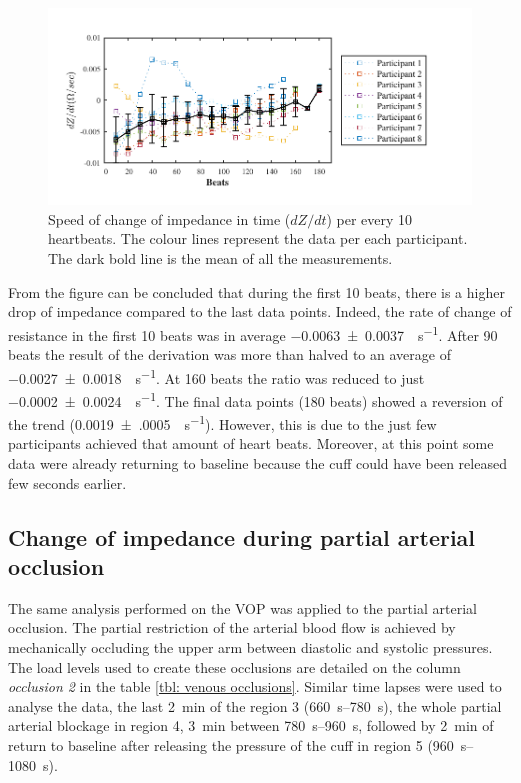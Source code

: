 \begin{figure}[htbp]
	\centering
	\includegraphics[width=15cm,keepaspectratio]{figure_vop_3}    
	\caption[Rate of change of impedance per 10 heartbeats during venous occlusion]{Speed of change of impedance in time ($dZ/dt$) per every 10 heartbeats. The colour lines represent the data per each participant. The dark bold line is the mean of all the measurements.}
	\label{fig:venous occlusion change}
\end{figure}

From the figure can be concluded that during the first 10 beats, there is a higher drop of impedance compared to the last data points. Indeed, the rate of change of resistance in the first 10 beats was in average \SI{-0.0063(00037)}{\Omega\per\second}. After 90 beats the result of the derivation was more than halved to an average of \SI{-0.0027(00018)}{\Omega\per\second}. At 160 beats the ratio was reduced to just \SI{-0.0002(00024)}{\Omega\per\second}. The final data points (180 beats) showed a reversion of the trend (\SI{0.0019(0005)}{\Omega\per\second}). However, this is due to the just few participants achieved that amount of heart beats.  Moreover, at this point some data were already returning to baseline because the cuff could have been released few seconds earlier.  
 

\subsection{Change of impedance during partial arterial occlusion}
\label{section occlusion 1.2}
The same analysis performed on the VOP was applied to the partial arterial occlusion. The partial restriction of the arterial blood flow is achieved by mechanically occluding the upper arm between diastolic and systolic pressures. The load levels used to create these occlusions are detailed on the column \textit{occlusion 2} in the table \ref{tbl: venous occlusions}. Similar time lapses were used to analyse the data, the last \SI{2}{\minute} of the region 3 (\SIrange{660}{780}{\second}), the whole partial arterial blockage in region 4, \SI{3}{\minute} between \SIrange{780}{960}{\second}, followed by \SI{2}{\minute} of return to baseline after releasing the pressure of the cuff in region 5 (\SIrange{960}{1080}{\second}).

